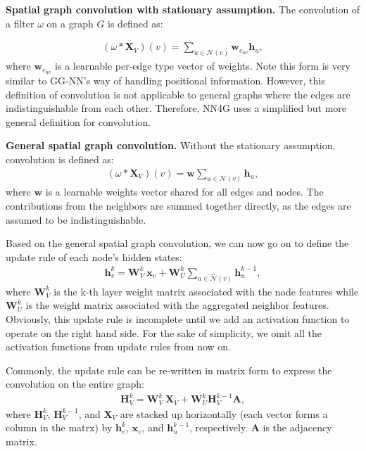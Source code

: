 \vspace{2mm}
\noindent \textbf{Spatial graph convolution with stationary assumption.} The convolution of a filter $\omega$ on a graph $G$ is defined as:

\begin{gather}
(\omega \ast \mathbf{X}_V) (v) = \sum_{u \in \mathcal {N}(v)} \mathbf{w}_{e_{uv}} \mathbf{h}_u,
\end{gather}
where $\mathbf{w}_{e_{uv}}$ is a learnable per-edge type vector of weights. Note this form is very similar to GG-NN's way of handling positional information. However, this definition of convolution is not applicable to general graphs where the edges are indistinguishable from each other. Therefore, NN4G uses a simplified but more general definition for convolution.

\vspace{2mm}
\noindent \textbf{General spatial graph convolution.} Without the stationary assumption, convolution is defined as:
\begin{gather}
(\omega \ast \mathbf{X}_V) (v)= \mathbf{w} \sum_{u \in \mathcal {N}(v)} \mathbf{h}_u,
\end{gather}
where $\mathbf{w}$ is a learnable weights vector shared for all edges and nodes. The contributions from the neighbors are summed together directly, as the edges are assumed to be indistinguishable. 

Based on the general spatial graph convolution, we can now go on to define the update rule of each node's hidden states:
\begin{gather}
\label{eq:nn4g}
\mathbf{h}_v ^k = \mathbf{W}_V^k~\mathbf{x}_v + \mathbf{W}_U^k \sum_{u \in \hat {\mathcal {N}}(v)} \mathbf{h}_u^{k-1},
\end{gather}
where $\mathbf{W}_V^k$ is the k-th layer weight matrix associated with the node features while $\mathbf{W}_U^k$ is the weight matrix associated with the aggregated neighbor features. Obviously, this update rule is incomplete until we add an activation function to operate on the right hand side. For the sake of simplicity, we omit all the activation functions from update rules from now on.

Commonly, the update rule can be re-written in matrix form to express the convolution on the entire graph:
\begin{gather}
\label{eq:nn4gm}
\mathbf{H}_V^k = \mathbf{W}_V^k~\mathbf{X}_V + \mathbf{W}_U^k \mathbf{H}_V^{k-1} \mathbf{A} ,
\end{gather}
where $\mathbf{H}_V^k$, $\mathbf{H}_V^{k-1}$, and $\mathbf{X}_V$ are stacked up horizontally (each vector forms a column in the matrx) by $\mathbf{h}_v ^k$, $\mathbf{x}_v$, and $\mathbf{h}_u^{k-1}$, respectively. $\mathbf{A}$ is the adjacency matrix.

